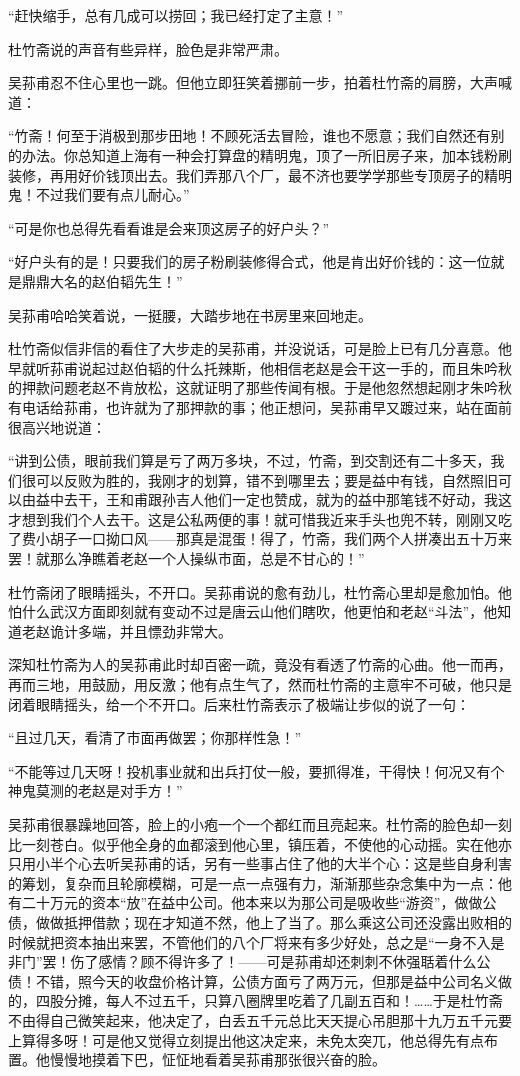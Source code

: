 \par “赶快缩手，总有几成可以捞回；我已经打定了主意！”
\par 杜竹斋说的声音有些异样，脸色是非常严肃。
\par 吴荪甫忍不住心里也一跳。但他立即狂笑着挪前一步，拍着杜竹斋的肩膀，大声喊道：
\par “竹斋！何至于消极到那步田地！不顾死活去冒险，谁也不愿意；我们自然还有别的办法。你总知道上海有一种会打算盘的精明鬼，顶了一所旧房子来，加本钱粉刷装修，再用好价钱顶出去。我们弄那八个厂，最不济也要学学那些专顶房子的精明鬼！不过我们要有点儿耐心。”
\par “可是你也总得先看看谁是会来顶这房子的好户头？”
\par “好户头有的是！只要我们的房子粉刷装修得合式，他是肯出好价钱的：这一位就是鼎鼎大名的赵伯韬先生！”
\par 吴荪甫哈哈笑着说，一挺腰，大踏步地在书房里来回地走。
\par 杜竹斋似信非信的看住了大步走的吴荪甫，并没说话，可是脸上已有几分喜意。他早就听荪甫说起过赵伯韬的什么托辣斯，他相信老赵是会干这一手的，而且朱吟秋的押款问题老赵不肯放松，这就证明了那些传闻有根。于是他忽然想起刚才朱吟秋有电话给荪甫，也许就为了那押款的事；他正想问，吴荪甫早又踱过来，站在面前很高兴地说道：
\par “讲到公债，眼前我们算是亏了两万多块，不过，竹斋，到交割还有二十多天，我们很可以反败为胜的，我刚才的划算，错不到哪里去；要是益中有钱，自然照旧可以由益中去干，王和甫跟孙吉人他们一定也赞成，就为的益中那笔钱不好动，我这才想到我们个人去干。这是公私两便的事！就可惜我近来手头也兜不转，刚刚又吃了费小胡子一口拗口风——那真是混蛋！得了，竹斋，我们两个人拼凑出五十万来罢！就那么净瞧着老赵一个人操纵市面，总是不甘心的！”
\par 杜竹斋闭了眼睛摇头，不开口。吴荪甫说的愈有劲儿，杜竹斋心里却是愈加怕。他怕什么武汉方面即刻就有变动不过是唐云山他们瞎吹，他更怕和老赵“斗法”，他知道老赵诡计多端，并且慓劲非常大。
\par 深知杜竹斋为人的吴荪甫此时却百密一疏，竟没有看透了竹斋的心曲。他一而再，再而三地，用鼓励，用反激；他有点生气了，然而杜竹斋的主意牢不可破，他只是闭着眼睛摇头，给一个不开口。后来杜竹斋表示了极端让步似的说了一句：
\par “且过几天，看清了市面再做罢；你那样性急！”
\par “不能等过几天呀！投机事业就和出兵打仗一般，要抓得准，干得快！何况又有个神鬼莫测的老赵是对手方！”
\par 吴荪甫很暴躁地回答，脸上的小疱一个一个都红而且亮起来。杜竹斋的脸色却一刻比一刻苍白。似乎他全身的血都滚到他心里，镇压着，不使他的心动摇。实在他亦只用小半个心去听吴荪甫的话，另有一些事占住了他的大半个心：这是些自身利害的筹划，复杂而且轮廓模糊，可是一点一点强有力，渐渐那些杂念集中为一点：他有二十万元的资本“放”在益中公司。他本来以为那公司是吸收些“游资”，做做公债，做做抵押借款；现在才知道不然，他上了当了。那么乘这公司还没露出败相的时候就把资本抽出来罢，不管他们的八个厂将来有多少好处，总之是“一身不入是非门”罢！伤了感情？顾不得许多了！——可是荪甫却还刺刺不休强聒着什么公债！不错，照今天的收盘价格计算，公债方面亏了两万元，但那是益中公司名义做的，四股分摊，每人不过五千，只算八圈牌里吃着了几副五百和！……于是杜竹斋不由得自己微笑起来，他决定了，白丢五千元总比天天提心吊胆那十九万五千元要上算得多呀！可是他又觉得立刻提出他这决定来，未免太突兀，他总得先有点布置。他慢慢地摸着下巴，怔怔地看着吴荪甫那张很兴奋的脸。
